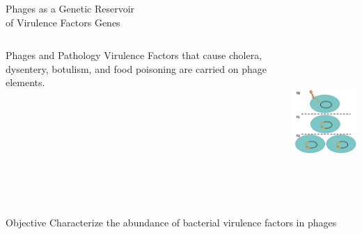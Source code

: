 \documentclass[11pt, xcolor=table]{beamer}
\begin{document}
	
	\begin{frame}{Phages as a Genetic Reservoir \\ of Virulence Factors Genes}
	\begin{columns}
	
	\begin{block}{Phages and Pathology}
	Virulence Factors that cause cholera, dysentery, botulism, and food poisoning are carried on phage elements.
	\end{block}
	
	\includegraphics[height=5.5cm, width=5cm]{CPBS_11_18/lysogeny.jpg} \\
	\hspace{0.5cm}	
	\end{columns}
	
	\begin{block}{Objective}
	Characterize the abundance of bacterial virulence factors in phages
	\end{block}
	
	\end{frame}
\end{document}
